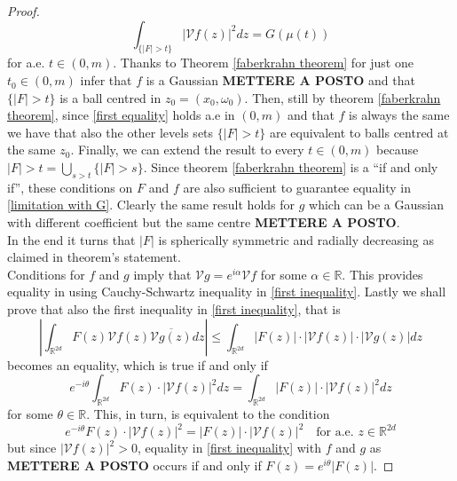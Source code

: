 \documentclass[corpo=11pt, stile=classica, tipotesi=custom,
greek, evenboxes, english]{toptesi}
\numberwithin{equation}{chapter}
\newcommand{\R}{\mathbb{R}} %
\newcommand{\V}{\mathcal{V}} %
\begin{document}
\begin{proof}
	\begin{equation}\label{first equality}
		\int_{\{|F|>t\}} |\V f(z)|^2 dz = G(\mu(t))
	\end{equation}
	for a.e. $t \in (0,m)$. Thanks to Theorem \ref{faberkrahn theorem} for just one $t_0 \in (0,m)$ infer that $f$ is a Gaussian \textbf{METTERE A POSTO} and that $\{|F|>t\}$ is a ball centred in $z_0 = (x_0,\omega_0)$. Then, still by theorem \ref{faberkrahn theorem}, since \eqref{first equality} holds a.e in $(0,m)$ and that $f$ is always the same we have that also the other levels sets $\{|F|>t\}$ are equivalent to balls centred at the same $z_0$. Finally, we can extend the result to every $t \in (0,m)$ because ${|F|>t} = \bigcup_{s > t} \{|F|>s\}$. Since theorem \ref{faberkrahn theorem} is a ``if and only if'', these conditions on $F$ and $f$ are also sufficient to guarantee equality in \eqref{limitation with G}. Clearly the same result holds for $g$ which can be a Gaussian with different coefficient but the same centre \textbf{METTERE A POSTO}.\\
	In the end it turns that $|F|$ is spherically symmetric and radially decreasing as claimed in theorem's statement.\\
	Conditions for $f$ and $g$ imply that $\V g  = e^{i \alpha} \V f$ for some $\alpha \in \R$. This provides equality in using Cauchy-Schwartz inequality in \eqref{first inequality}. Lastly we shall prove that also the first inequality in \eqref{first inequality}, that is
	\begin{equation*}
		\left\vert \int_{\R^{2d}} F(z) \V f(z) \overline{\V g(z)} dz \right\vert \leq \int_{\R^{2d}} |F(z)| \cdot | \V f(z)| \cdot |\V g(z)| dz
	\end{equation*}
	becomes an equality, which is true if and only if
	\begin{equation*}
		e^{-i\theta}  \int_{\R^{2d}} F(z) \cdot |\V f(z)|^2 dz = \int_{\R^{2d}} |F(z)| \cdot | \V f(z)|^2 dz
	\end{equation*}
	for some $\theta \in \R$. This, in turn, is equivalent to the condition
	\begin{equation*}
		e^{-i \theta}F(z) \cdot |\V f(z)|^2 = |F(z)| \cdot |\V f(z)|^2 \quad \text{for a.e. } z \in \R^{2d}
	\end{equation*}
	but since $|\V f(z)|^2 > 0$, equality in \ref{first inequality} with $f$ and $g$ as \textbf{METTERE A POSTO} occurs if and only if $F(z) = e^{i \theta} |F(z)|$.
\end{proof}
\end{document}
